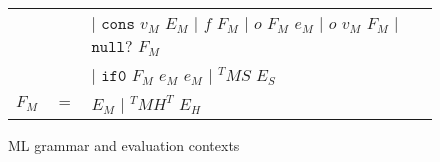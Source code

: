 \begin{figure}[p]
\begin{tabular}{lcl}
&& $\vert$ $\mathtt{cons}$ $v_{M}$ $E_{M}$ $\vert$ $f$ $F_{M}$ $\vert$ $o$ $F_{M}$ $e_{M}$ $\vert$ $o$ $v_{M}$ $F_{M}$ $\vert$ $\mathtt{null?}$ $F_{M}$ \\

\vspace{5pt}

&& $\vert$ $\mathtt{if0}$ $F_{M}$ $e_{M}$ $e_{M}$ $\vert$ $^{T}MS$ $E_{S}$ \\

\vspace{5pt}

$F_{M}$ & $=$ & $E_{M}$ $\vert$ $^{T}MH^{T}$ $E_{H}$
\end{tabular}
\caption{ML grammar and evaluation contexts}
\label{mg}
\end{figure}